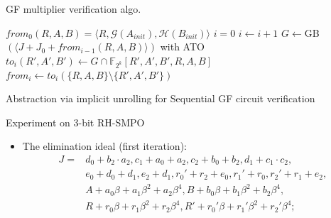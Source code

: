 \documentclass[xcolor=dvipsnames]{beamer}
\newcommand{\bi}{\begin{itemize}}
\newcommand{\ei}{\end{itemize}}
\begin{document}
\begin{frame}{\large{GF multiplier verification algo.}}
\begin{algorithm}[H] %
\SetAlgoNoLine

  $from_0(R,A,B) = \langle R, \mathcal{G}(A_{init}), \mathcal{H}(B_{init})\rangle$\;
  $i = 0$\;
  {
  	$i \gets i + 1$\;
	\alert{$G \gets$GB$( \langle J + J_0+ from_{i-1}(R,A,B) \rangle)$ with ATO}\;
	$to_i(R',A',B')\gets G\cap \mathbb F_{2^k}[R',A',B',R,A,B]$\;
	$from_i \gets to_i(\{R,A,B\}\setminus \{R',A',B'\})$\;
  }
\caption {Abstraction via implicit unrolling for Sequential GF circuit verification}
\end{algorithm}
\end{frame}
\begin{frame}{\large{Experiment on 3-bit RH-SMPO}}
\begin{figure}[hbt]
\end{figure}
\vspace{-0.2in}
\bi
\item The elimination ideal (first iteration):
\begin{align*}
J = &d_0+b_2\cdot a_2,
c_1+a_0+a_2,
c_2+b_0+b_2,
d_1+c_1\cdot c_2,\\
&e_0+d_0+d_1,
e_2+d_1,
r_0'+r_2+e_0,
r_1'+r_0,
r_2'+r_1+e_2,\\
&A+a_0\beta+a_1\beta^2+a_2\beta^4,
B+b_0\beta+b_1\beta^2+b_2\beta^4,\\
&R+r_0\beta+r_1\beta^2+r_2\beta^4,
R'+r_0'\beta+r_1'\beta^2+r_2'\beta^4;
\end{align*}
\ei
\end{frame}
\end{document}
